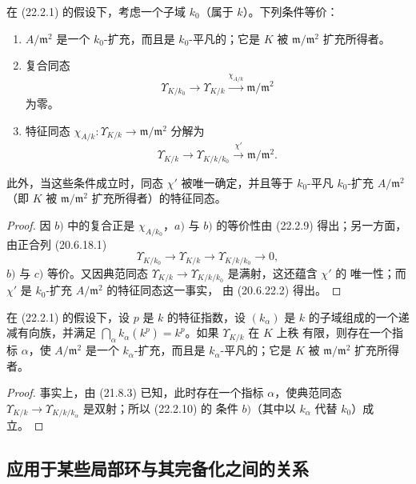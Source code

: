 \begin{corollary}[22.2.10]
\label{0.22.2.10-fr}
在 (22.2.1) 的假设下，考虑一个子域 $k_0$（属于 $k$）。下列条件等价：
\begin{enumerate}
  \item[a)] $A/\mathfrak m^2$ 是一个 $k_0$-扩充，而且是
  $k_0$-平凡的；它是 $K$ 被 $\mathfrak m/\mathfrak m^2$ 扩充所得者。
  \item[b)] 复合同态
  \[
    \Upsilon_{K/k_0}\longrightarrow\Upsilon_{K/k}
    \xrightarrow{\chi_{A/k}}\mathfrak m/\mathfrak m^2
  \]
  为零。
  \item[c)] 特征同态
  $\chi_{A/k}:\Upsilon_{K/k}\to\mathfrak m/\mathfrak m^2$ 分解为
  \[
    \Upsilon_{K/k}\longrightarrow\Upsilon_{K/k/k_0}
    \xrightarrow{\chi'}\mathfrak m/\mathfrak m^2.
  \]
\end{enumerate}
此外，当这些条件成立时，同态 $\chi'$ 被唯一确定，并且等于
$k_0$-平凡 $k_0$-扩充 $A/\mathfrak m^2$（即 $K$ 被
$\mathfrak m/\mathfrak m^2$ 扩充所得者）的特征同态。
\end{corollary}

\begin{proof}
因 $b)$ 中的复合正是 $\chi_{A/k_0}$，$a)$ 与 $b)$ 的等价性由
(22.2.9) 得出；另一方面，由正合列 (20.6.18.1)
\[
  \Upsilon_{K/k_0}\longrightarrow\Upsilon_{K/k}
  \longrightarrow\Upsilon_{K/k/k_0}\longrightarrow0,
\]
$b)$ 与 $c)$ 等价。又因典范同态
$\Upsilon_{K/k}\to\Upsilon_{K/k/k_0}$ 是满射，这还蕴含 $\chi'$ 的
唯一性；而 $\chi'$ 是 $k_0$-扩充 $A/\mathfrak m^2$ 的特征同态这一事实，
由 (20.6.22.2) 得出。
\end{proof}

\begin{corollary}[22.2.11]
\label{0.22.2.11-fr}
在 (22.2.1) 的假设下，设 $p$ 是 $k$ 的特征指数，设 $(k_\alpha)$ 是
$k$ 的子域组成的一个递减有向族，并满足
$\bigcap_\alpha k_\alpha(k^p)=k^p$。如果 $\Upsilon_{K/k}$ 在 $K$ 上秩
有限，则存在一个指标 $\alpha$，使 $A/\mathfrak m^2$ 是一个
$k_\alpha$-扩充，而且是 $k_\alpha$-平凡的；它是 $K$ 被
$\mathfrak m/\mathfrak m^2$ 扩充所得者。
\end{corollary}

\begin{proof}
事实上，由 (21.8.3) 已知，此时存在一个指标 $\alpha$，使典范同态
$\Upsilon_{K/k}\to\Upsilon_{K/k/k_\alpha}$ 是双射；所以 (22.2.10) 的
条件 $b)$（其中以 $k_\alpha$ 代替 $k_0$）成立。
\end{proof}


\subsection{应用于某些局部环与其完备化之间的关系}
\label{subsection:0.22.3-fr}

